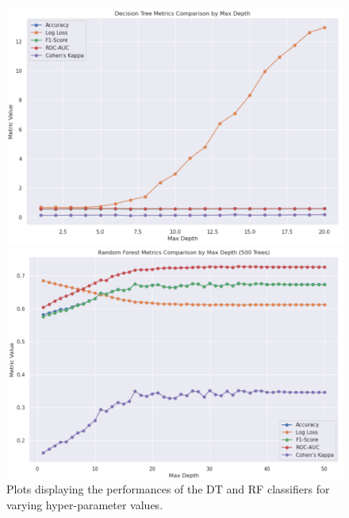 \documentclass{article}
\begin{document}
\begin{figure}[htbp]
\centering
\begin{minipage}{.5\textwidth}
  \centering
  \includegraphics[width=.9\linewidth]{Figures/DT_hyperparameter.png}
\end{minipage}%
\begin{minipage}{.5\textwidth}
  \centering
  \includegraphics[width=.9\linewidth]{Figures/RF_max_depth.png}
\end{minipage}
\caption{Plots displaying the performances of the DT and RF classifiers for varying hyper-parameter values.}
\label{fig:hyperparameter}
\end{figure}
\end{document}

